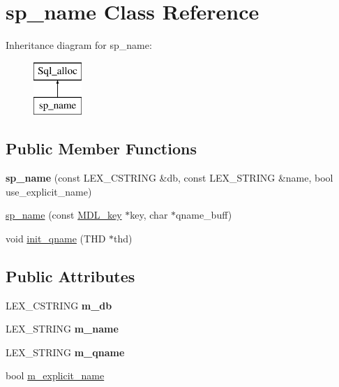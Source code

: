 \hypertarget{classsp__name}{}\section{sp\+\_\+name Class Reference}
\label{classsp__name}
Inheritance diagram for sp\+\_\+name\+:\begin{figure}[H]
\begin{center}
\leavevmode
\includegraphics[height=2.000000cm]{classsp__name}
\end{center}
\end{figure}
\subsection*{Public Member Functions}
\begin{DoxyCompactItemize}
\item 
\mbox{\label{classsp__name_aa9d453be69ea04499e2c4845e627adba}} 
{\bfseries sp\+\_\+name} (const L\+E\+X\+\_\+\+C\+S\+T\+R\+I\+NG \&db, const L\+E\+X\+\_\+\+S\+T\+R\+I\+NG \&name, bool use\+\_\+explicit\+\_\+name)
\item 
\mbox{\hyperlink{classsp__name_ac3c55e826c7449a541ff7033d368bb2a}{sp\+\_\+name}} (const \mbox{\hyperlink{structMDL__key}{M\+D\+L\+\_\+key}} $\ast$key, char $\ast$qname\+\_\+buff)
\item 
void \mbox{\hyperlink{classsp__name_a95e689b3d9e830936eb4460df42e2d39}{init\+\_\+qname}} (T\+HD $\ast$thd)
\end{DoxyCompactItemize}
\subsection*{Public Attributes}
\begin{DoxyCompactItemize}
\item 
\mbox{\label{classsp__name_ad562a35d4d21dae094258fe65b4baa5c}} 
L\+E\+X\+\_\+\+C\+S\+T\+R\+I\+NG {\bfseries m\+\_\+db}
\item 
\mbox{\label{classsp__name_a9e88b6dcfd1315cd5640c9a7a01eee10}} 
L\+E\+X\+\_\+\+S\+T\+R\+I\+NG {\bfseries m\+\_\+name}
\item 
\mbox{\label{classsp__name_a57b240b04ab34f71cb7c42e0a1b32ccf}} 
L\+E\+X\+\_\+\+S\+T\+R\+I\+NG {\bfseries m\+\_\+qname}
\item 
bool \mbox{\hyperlink{classsp__name_a6ddb16b2a338929f8cab46a8c37f1f5f}{m\+\_\+explicit\+\_\+name}}
\end{DoxyCompactItemize}
